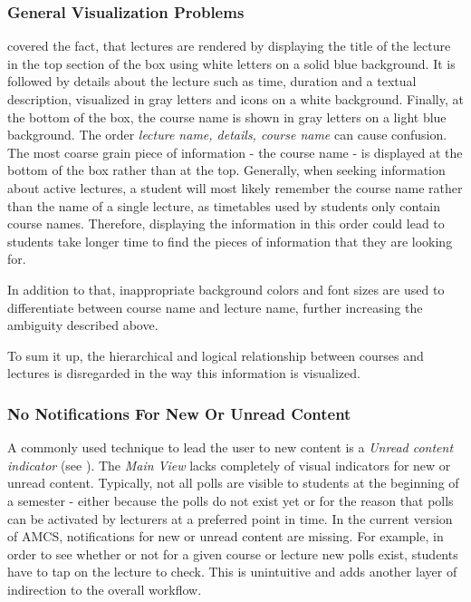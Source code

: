 \subsubsection{General Visualization Problems}
\label{section:con:problems:mainview:generalvis}  covered the fact, that lectures are rendered by displaying the title of the lecture in the top section of the box using white letters on a solid blue background. It is followed by details about the lecture such as time, duration and a textual description, visualized in gray letters and icons on a white background. Finally, at the bottom of the box, the course name is shown in gray letters on a light blue background. The order \emph{lecture name, details, course name} can cause confusion.
The most coarse grain piece of information - the course name - is displayed at the bottom of the box rather than at the top. Generally, when seeking information about active lectures, a student will most likely remember the course name rather than the name of a single lecture, as timetables used by students only contain course names. Therefore, displaying the information in this order could lead to students take longer time to find the pieces of information that they are looking for.

In addition to that, inappropriate background colors and font sizes are used to differentiate between course name and lecture name, further increasing the ambiguity described above.

To sum it up, the hierarchical and logical relationship between courses and lectures is disregarded in the way this information is visualized. 

\subsubsection{No Notifications For New Or Unread Content}
\label{section:con:problems:noindicators}
A commonly used technique to lead the user to new content is a \emph{Unread content indicator} (see ).
The \emph{Main View} lacks completely of visual indicators for new or unread content. Typically, not all polls are visible to students at the beginning of a semester - either because the polls do not exist yet or for the reason that polls can be activated by lecturers at a preferred point in time. In the current version of AMCS, notifications for new or unread content are missing. For example, in order to see whether or not for a given course or lecture new polls exist, students have to tap on the lecture to check. This is unintuitive and adds another layer of indirection to the overall workflow.

